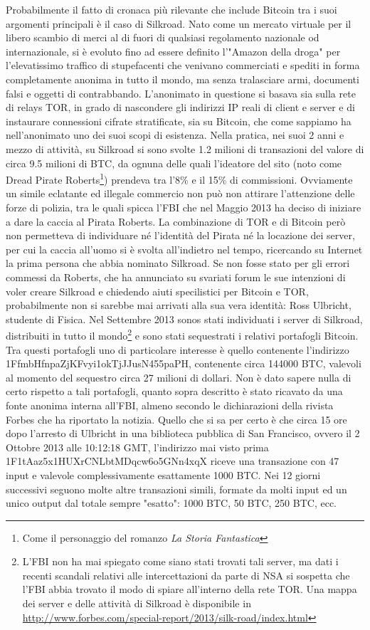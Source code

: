 Probabilmente il fatto di cronaca più rilevante che include Bitcoin tra i suoi argomenti principali è il caso di Silkroad.
Nato come un mercato virtuale per il libero scambio di merci al di fuori di qualsiasi regolamento nazionale od internazionale, si è evoluto fino ad essere definito l'"Amazon della droga" per l'elevatissimo traffico di stupefacenti che venivano commerciati e spediti in forma completamente anonima in tutto il mondo, ma senza tralasciare armi, documenti falsi e oggetti di contrabbando.
L'anonimato in questione si basava sia sulla rete di relays TOR, in grado di nascondere gli indirizzi IP reali di client e server e di instaurare connessioni cifrate stratificate, sia su Bitcoin, che come sappiamo ha nell'anonimato uno dei suoi scopi di esistenza.
Nella pratica, nei suoi 2 anni e mezzo di attività, su Silkroad si sono svolte 1.2 milioni di transazioni del valore di circa 9.5 milioni di BTC, da ognuna delle quali l'ideatore del sito (noto come Dread Pirate Roberts\footnote{Come il personaggio del romanzo \emph{La Storia Fantastica}}) prendeva tra l'8\% e il 15\% di commissioni.
Ovviamente un simile eclatante ed illegale commercio non può non attirare l'attenzione delle forze di polizia, tra le quali spicca l'FBI che nel Maggio 2013 ha deciso di iniziare a dare la caccia al Pirata Roberts.
La combinazione di TOR e di Bitcoin però non permetteva di individuare né l'identità del Pirata né la locazione dei server, per cui la caccia all'uomo si è svolta all'indietro nel tempo, ricercando su Internet la prima persona che abbia nominato Silkroad.
Se non fosse stato per gli errori commessi da Roberts, che ha annunciato su svariati forum le sue intenzioni di voler creare Silkroad e chiedendo aiuti specilistici per Bitcoin e TOR, probabilmente non si sarebbe mai arrivati alla sua vera identità: Ross Ulbricht, studente di Fisica.
Nel Settembre 2013 sonos stati individuati i server di Silkroad, distribuiti in tutto il mondo\footnote{L'FBI non ha mai spiegato come siano stati trovati tali server, ma dati i recenti scandali relativi alle intercettazioni da parte di NSA si sospetta che l'FBI abbia trovato il modo di spiare all'interno della rete TOR. Una mappa dei server e delle attività di Silkroad è disponibile in \url{http://www.forbes.com/special-report/2013/silk-road/index.html}} e sono stati sequestrati i relativi portafogli Bitcoin.
Tra questi portafogli uno di particolare interesse è quello contenente l'indirizzo 1FfmbHfnpaZjKFvyi1okTjJJusN455paPH, contenente circa 144000 BTC, valevoli al momento del sequestro circa 27 milioni di dollari.
Non è dato sapere nulla di certo rispetto a tali portafogli, quanto sopra descritto è stato ricavato da una fonte anonima interna all'FBI, almeno secondo le dichiarazioni della rivista Forbes che ha riportato la notizia. Quello che si sa per certo è che circa 15 ore dopo l'arresto di Ulbricht in una biblioteca pubblica di San Francisco, ovvero il 2 Ottobre 2013 alle 10:12:18 GMT, l'indirizzo mai visto prima 1F1tAaz5x1HUXrCNLbtMDqcw6o5GNn4xqX riceve una transazione con 47 input e valevole complessivamente esattamente 1000 BTC. Nei 12 giorni successivi seguono molte altre transazioni simili, formate da molti input ed un unico output dal totale sempre "esatto": 1000 BTC, 50 BTC, 250 BTC, ecc.
